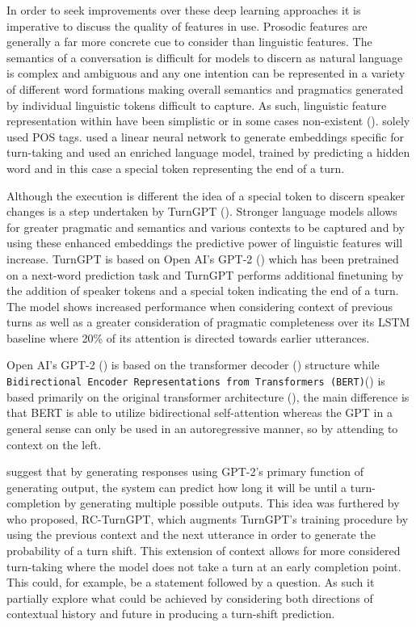 \documentclass[logo,bsc,singlespacing,parskip]{infthesis}
\begin{document}
In order to seek improvements over these deep learning approaches it is imperative to discuss the quality of features in use. Prosodic features are generally a far more concrete cue to consider than linguistic features. The semantics of a conversation is difficult for models to discern as natural language is complex and ambiguous and any one intention can be represented in a variety of different word formations making overall semantics and pragmatics generated by individual linguistic tokens difficult to capture. As such, linguistic feature representation within \cite{Roddy2018a, Skantze2017, Maier2017} have been simplistic or in some cases non-existent (\cite{Ward2018}). \cite{Skantze2017} solely used POS tags. \cite{Roddy2018a} used a linear neural network to generate embeddings specific for turn-taking and \cite{Maier2017} used an enriched language model, trained by predicting a hidden word and in this case a special token representing the end of a turn. 

Although the execution is different the idea of a special token to discern speaker changes is a step undertaken by TurnGPT (\cite{Ekstedt2020}). Stronger language models allows for greater pragmatic and semantics and various contexts to be captured and by using these enhanced embeddings the predictive power of linguistic features will increase. TurnGPT is based on Open AI's GPT-2 (\cite{Radford2019}) which has been pretrained on a next-word prediction task and TurnGPT performs additional finetuning by the addition of speaker tokens and a special token indicating the end of a turn. The model shows increased performance when considering context of previous turns as well as a greater consideration of pragmatic completeness over its LSTM baseline where 20\% of its attention is directed towards earlier utterances.

Open AI's GPT-2 (\cite{Radford2019}) is based on the transformer decoder (\cite{Liu2018}) structure while \texttt{Bidirectional Encoder Representations from Transformers (BERT)}(\cite{}) is based primarily on the original transformer architecture (\cite{Vaswani2017}), the main difference is that BERT is able to utilize bidirectional self-attention whereas the GPT in a general sense can only be used in an autoregressive manner, so by attending to context on the left. 

\cite{Ekstedt2020} suggest that by generating responses using GPT-2's primary function of generating output, the system can predict how long it will be until a turn-completion by generating multiple possible outputs. This idea was furthered by \cite{Jiang2023} who proposed, RC-TurnGPT, which augments TurnGPT's training procedure by using the previous context and the next utterance in order to generate the probability of a turn shift. This extension of context allows for more considered turn-taking where the model does not take a turn at an early completion point. This could, for example, be a statement followed by a question.
As such it partially explore what could be achieved by considering both directions of contextual history and future in producing a turn-shift prediction.  
\end{document}
